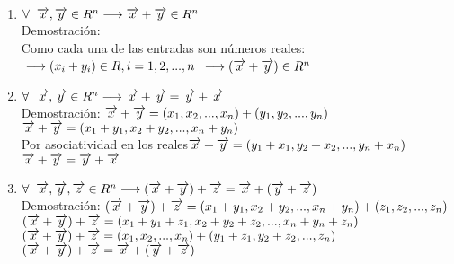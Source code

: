 \documentclass{book}
\begin{document}
\begin{enumerate}
    \item $\forall \hspace*{0.2cm}\overrightarrow{x},\overrightarrow{y}\in R^n \longrightarrow \overrightarrow{x}+\overrightarrow{y}\in R^n$
    \\Demostración:
    \\Como cada una de las entradas son números reales:
    $\\\longrightarrow(x_{i}+y_{i})\in R, i=1,2,...,n$
    $\\\longrightarrow (\overrightarrow{x}+\overrightarrow{y})\in R^n$

    \item $\forall \hspace{0.2 cm}\overrightarrow{x}, \overrightarrow{y} \in R^n \longrightarrow \overrightarrow{x}+\overrightarrow{y}=\overrightarrow{y}+\overrightarrow{x}$
    \\Demostración:
    $\\\overrightarrow{x}+\overrightarrow{y}=(x_{1},x_{2},...,x_{n})+(y_{1},y_{2},...,y_{n})$
    $\\\overrightarrow{x}+\overrightarrow{y}=(x_{1}+y_{1},x_{2}+y_{2},...,x_{n}+y_{n})$
    \\Por asociatividad en los reales$\\\overrightarrow{x}+\overrightarrow{y}=(y_{1}+x_{1},y_{2}+x_{2},...,y_{n}+x_{n})$
    $\\\overrightarrow{x}+\overrightarrow{y}=\overrightarrow{y}+\overrightarrow{x}$
    \item $\forall \hspace*{0.2cm}\overrightarrow{x},\overrightarrow{y},\overrightarrow{z}\in R^n \longrightarrow (\overrightarrow{x}+\overrightarrow{y})+\overrightarrow{z}=\overrightarrow{x}+(\overrightarrow{y}+\overrightarrow{z})$
    \\Demostración: 
    $\\(\overrightarrow{x}+\overrightarrow{y})+\overrightarrow{z}=(x_{1}+y_{1},x_{2}+y_{2},...,x_{n}+y_{n})+(z_{1},z_{2},...,z_{n})$
    $\\(\overrightarrow{x}+\overrightarrow{y})+\overrightarrow{z}=(x_{1}+y_{1}+z_{1},x_{2}+y_{2}+z_{2},...,x_{n}+y_{n}+z_{n})$
    $\\(\overrightarrow{x}+\overrightarrow{y})+\overrightarrow{z}=(x_{1},x_{2},...,x_{n})+(y_{1}+z_{1},y_{2}+z_{2},...,z_{n})$
    $\\(\overrightarrow{x}+\overrightarrow{y})+\overrightarrow{z}=\overrightarrow{x}+(\overrightarrow{y}+\overrightarrow{z})$

\end{enumerate}
\end{document}
